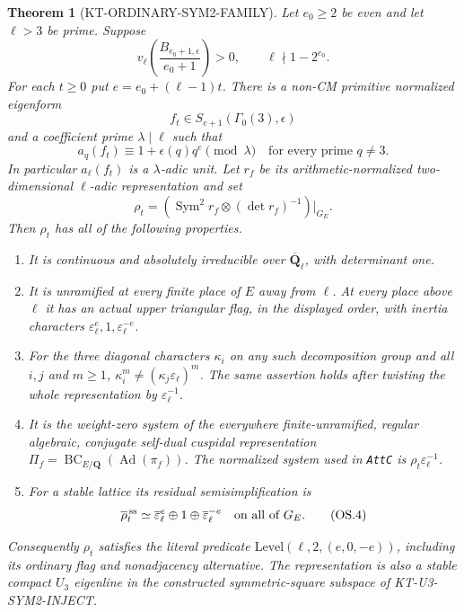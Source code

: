 \documentclass[11pt,a4paper]{article}
\newtheorem{theorem}{Theorem}[section]
\theoremstyle{definition}
\begin{document}
\begin{theorem}[KT-ORDINARY-SYM2-FAMILY]
Let $e_0\geq2$ be even and let $\ell>3$ be prime. Suppose
\[
 v_\ell\!\left(\frac{B_{e_0+1,\epsilon}}{e_0+1}\right)>0,
 \qquad \ell\nmid1-2^{e_0}.                         \tag{OS.1}
\]
For each $t\geq0$ put $e=e_0+(\ell-1)t$. There is a
non-CM primitive normalized eigenform
\[
 f_t\in S_{e+1}(\Gamma_0(3),\epsilon)
\]
and a coefficient prime $\lambda\mid\ell$ such that
\[
 a_q(f_t)\equiv1+\epsilon(q)q^e\pmod\lambda
                       \quad\text{for every prime }q\ne3.
                                                               \tag{OS.2}
\]
In particular $a_\ell(f_t)$ is a $\lambda$-adic unit.
Let $r_f$ be its arithmetic-normalized two-dimensional
$\ell$-adic representation and set
\[
 \rho_t=\left(\operatorname{Sym}^2r_f\otimes
                         (\det r_f)^{-1}\right)|_{G_E}.
                                                               \tag{OS.3}
\]
Then $\rho_t$ has all of the following properties.
\begin{enumerate}
\item It is continuous and absolutely irreducible over
      $\overline{\mathbf Q}_\ell$, with determinant one.
\item It is unramified at every finite place of $E$ away from
      $\ell$. At every place above $\ell$ it has an actual
      upper triangular flag, in the displayed order, with
      inertia characters
      $\varepsilon_\ell^e,1,\varepsilon_\ell^{-e}$.
\item For the three diagonal characters $\kappa_i$ on any
      such decomposition group and all $i,j$ and $m\geq1$,
      $\kappa_i^m\ne(\kappa_j\varepsilon_\ell)^m$.
      The same assertion holds after twisting the whole
      representation by $\varepsilon_\ell^{-1}$.
\item It is the weight-zero system of the everywhere
      finite-unramified, regular algebraic, conjugate
      self-dual cuspidal representation
      $\Pi_f=\operatorname{BC}_{E/\mathbf Q}
                    (\operatorname{Ad}(\pi_f))$.
      The normalized system used in \texttt{AttC} is
      $\rho_t\varepsilon_\ell^{-1}$.
\item For a stable lattice its residual semisimplification is
\[
       \overline\rho_t^{\,\rm ss}
           \simeq\overline\varepsilon_\ell^e\oplus1\oplus
                           \overline\varepsilon_\ell^{-e}
                      \quad\text{on all of }G_E.              \tag{OS.4}
\]
\end{enumerate}
Consequently $\rho_t$ satisfies the literal predicate
$\mathrm{Level}(\ell,2,(e,0,-e))$, including its ordinary
flag and nonadjacency alternative. The representation is
also a stable compact $U_3$ eigenline in the constructed
symmetric-square subspace of KT-U3-SYM2-INJECT.
\end{theorem}
\end{document}
